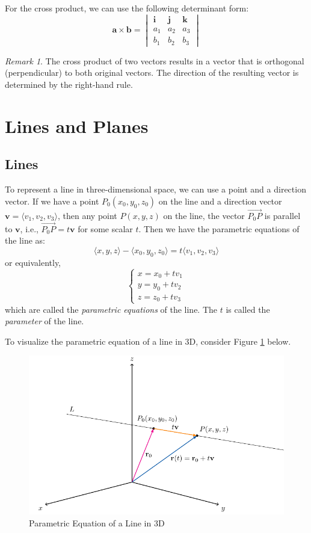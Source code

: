 \documentclass{book}
\theoremstyle{remark}
\newtheorem*{remark}{Remark}
\begin{document}
For the cross product, we can use the following determinant form:
\[
    \mathbf{a} \times \mathbf{b} = \begin{vmatrix}
    \mathbf{i} & \mathbf{j} & \mathbf{k} \\
    a_1 & a_2 & a_3 \\
    b_1 & b_2 & b_3
    \end{vmatrix}
\]

\begin{remark}
    The cross product of two vectors results in a vector that is orthogonal (perpendicular) to both original vectors. The direction of the resulting vector is determined by the right-hand rule.
\end{remark}

\section{Lines and Planes}

\subsection{Lines}

To represent a line in three-dimensional space, we can use a point and a direction vector. If we have a point $P_0(x_0, y_0, z_0)$ on the line and a direction vector $\mathbf{v} = \langle v_1, v_2, v_3 \rangle$, then any point $P(x, y, z)$ on the line, the vector $\overrightarrow{P_0P}$ is parallel to $\mathbf{v}$, i.e., $\overrightarrow{P_0P} = t\mathbf{v}$ for some scalar $t$. Then we have the parametric equations of the line as:
\[
    \langle x, y, z \rangle - \langle x_0, y_0, z_0 \rangle = t \langle v_1, v_2, v_3 \rangle
\]
or equivalently,
\[
    \begin{cases}
        x = x_0 + tv_1 \\
        y = y_0 + tv_2 \\
        z = z_0 + tv_3
    \end{cases}
\]
which are called the \emph{parametric equations} of the line. The $t$ is called the \emph{parameter} of the line.

To visualize the parametric equation of a line in 3D, consider Figure \ref{fig:3d_line_parametric} below.
\begin{figure}[ht]
    \centering
    \includegraphics{figures/2d_plane_equation.pdf}
    \caption{Parametric Equation of a Line in 3D}\label{fig:3d_line_parametric}
\end{figure}
\end{document}
